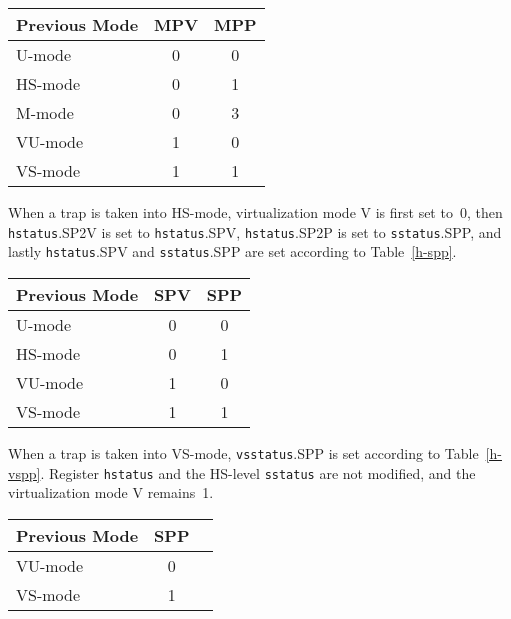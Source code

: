 \begin{table*}[h!]
\begin{center}
\begin{tabular}{|l|c|c|}
  \hline
  Previous Mode & MPV & MPP \\ \hline
  U-mode        & 0   & 0   \\
  HS-mode       & 0   & 1   \\
  M-mode        & 0   & 3   \\ \hline
  VU-mode       & 1   & 0   \\
  VS-mode       & 1   & 1   \\ \hline
\end{tabular}
\end{center}
\caption{Value of {\tt mstatus} fields MPV and MPP after a trap into M-mode.
Upon trap return, MPV is ignored when MPP=3.}
\label{h-mpp}
\end{table*}

When a trap is taken into HS-mode, virtualization mode V is first set
to~0,
then {\tt hstatus}.SP2V is set to {\tt hstatus}.SPV, {\tt hstatus}.SP2P is set
to {\tt sstatus}.SPP, and lastly {\tt hstatus}.SPV and {\tt sstatus}.SPP are
set according to Table~\ref{h-spp}.

\begin{table*}[h!]
\begin{center}
\begin{tabular}{|l|c|c|}
  \hline
  Previous Mode & SPV & SPP \\ \hline
  U-mode        & 0   & 0   \\
  HS-mode       & 0   & 1   \\ \hline
  VU-mode       & 1   & 0   \\
  VS-mode       & 1   & 1   \\ \hline
\end{tabular}
\end{center}
\caption{Value of {\tt hstatus} field SPV and {\tt sstatus} field SPP after a trap into HS-mode.}
\label{h-spp}
\end{table*}

When a trap is taken into VS-mode, {\tt vsstatus}.SPP is set according to
Table~\ref{h-vspp}.
Register {\tt hstatus} and the HS-level {\tt sstatus} are not modified,
and the virtualization mode V remains~1.

\begin{table*}[h!]
\begin{center}
\begin{tabular}{|l|c|c|}
  \hline
  Previous Mode & SPP \\ \hline
  VU-mode       & 0   \\
  VS-mode       & 1   \\ \hline
\end{tabular}
\end{center}
\caption{Value of {\tt vsstatus} field SPP after a trap into VS-mode.}
\label{h-vspp}
\end{table*}

